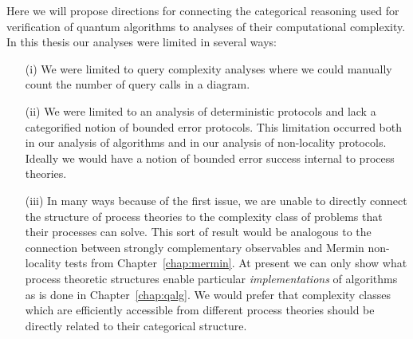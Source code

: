 Here we will propose directions for connecting the categorical reasoning used for verification of quantum algorithms to analyses of their computational complexity. In this thesis our analyses were limited in several ways: 
\begin{enumerate}
\item[(i)] We were limited to query complexity analyses where we could manually count the number of query calls in a diagram. 
\item[(ii)] We were limited to an analysis of deterministic protocols and lack a categorified notion of bounded error protocols. This limitation occurred both in our analysis of algorithms and in our analysis of non-locality protocols. Ideally we would have a notion of bounded error success internal to process theories.
\item[(iii)] In many ways because of the first issue, we are unable to directly connect the structure of process theories to the complexity class of problems that their processes can solve. This sort of result would be analogous to the connection between strongly complementary observables and Mermin non-locality tests from Chapter~\ref{chap:mermin}. At present we can only show what process theoretic structures enable particular \emph{implementations} of algorithms as is done in Chapter~\ref{chap:qalg}. We would prefer that complexity classes which are efficiently accessible from different  process theories should be directly related to their categorical structure.
\end{enumerate}

